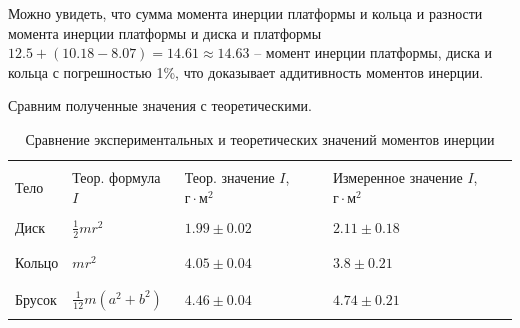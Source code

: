 \documentclass[a4paper,12pt]{article}
\begin{document}
\begin{enumerate}
    Можно увидеть, что сумма момента инерции платформы и кольца и разности момента инерции платформы и диска и платформы $12.5 + (10.18-8.07) = 14.61 \approx 14.63$ -- момент инерции платформы, диска и кольца с погрешностью 1\%, что доказывает аддитивность моментов инерции.

    

    Сравним полученные значения с теоретическими.
    \begin{table}[H]
        \centering
        \begin{tabular}{|C{3 cm}|C{3 cm}|C{3 cm}|C{3 cm}|}
            \hline
            & & & \\
            Тело & Теор. формула $I$ & Теор. значение $I$, $г \cdot м^2$ & Измеренное значение $I$, $г \cdot м^2$ \\
            \hline
            & & & \\
            Диск & $\frac{1}{2} mr^2$ & $1.99 \pm 0.02$ & $2.11 \pm 0.18$  \\
            & & & \\
            \hline
            & & & \\
            Кольцо & $mr^2$ & $4.05 \pm 0.04$ & $3.8 \pm 0.21$ \\
            & & & \\
            \hline
            & & & \\
            Брусок & $\frac{1}{12} m(a^2+b^2)$ & $4.46 \pm 0.04 $ & $4.74 \pm 0.21$ \\
            & & & \\
            \hline
        \end{tabular}
        \caption{Сравнение экспериментальных и теоретических значений моментов инерции}
    \end{table}


\end{enumerate}
\end{document}
